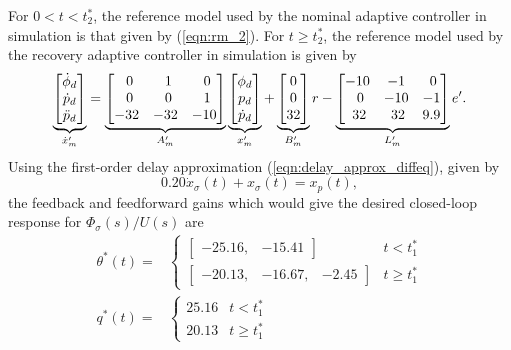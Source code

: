 For $0 < t < t_2^*$, the reference model used by the nominal adaptive controller in simulation is that given by (\ref{eqn:rm_2}). For $t \geq t_2^*$, the reference model used by the recovery adaptive controller in simulation is given by
\begin{equation}
	\underbrace{\begin{bmatrix}
		\dot{\phi}_d \\ \dot{p}_d \\ \ddot{p}_d
	\end{bmatrix}}_{\dot{x}_m'} = \underbrace{\begin{bmatrix}
		\hfil 0 & \hfil 1 & \hfil 0\\ \hfil 0 & \hfil 0 & \hfil 1 \\ -32 & -32 & -10
	\end{bmatrix}}_{A_m'} \underbrace{\begin{bmatrix}
		\phi_d \\ p_d \\ \dot{p}_d
	\end{bmatrix}}_{x_m'} + \underbrace{\begin{bmatrix}
		0 \\ 0 \\ 32
	\end{bmatrix}}_{B_m'} r - \underbrace{\begin{bmatrix}
		-10 & -1 & \hfil 0 \\ \hfil 0 & \hfil -10 & \hfil -1 \\ \hfil 32 & \hfil 32 & \hfil 9.9
	\end{bmatrix}}_{L_m'} e'.
	\label{eqn:rm_3_delay}
\end{equation}
Using the first-order delay approximation (\ref{eqn:delay_approx_diffeq}), given by
\begin{equation}
	0.20 \dot{x}_{\sigma}(t) + x_{\sigma}(t) = x_p(t),
\end{equation}
the feedback and feedforward gains which would give the desired closed-loop response for $\Phi_\sigma(s)/U(s)$ are
\begin{align}
	\theta^*(t) = & \begin{cases} \begin{bmatrix} -25.16, & -15.41 \end{bmatrix} & t < t_1^* \\ \begin{bmatrix}-20.13, & -16.67, & -2.45\end{bmatrix} & t \geq t_1^* \end{cases} \\
	q^*(t) = &\begin{cases} 25.16 & t < t_1^* \\ 20.13 & t \geq t_1^* \end{cases}
\end{align}


